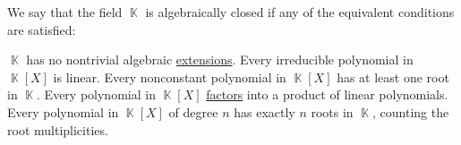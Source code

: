 \begin{definition}\label{def:algebraically_closed_field}
  We say that the field \( \BbbK \) is algebraically closed if any of the equivalent conditions are satisfied:
  \begin{thmenum}
     \( \BbbK \) has no nontrivial algebraic \hyperref[def:transcendental_element]{extensions}.
     Every irreducible polynomial in \( \BbbK[X] \) is linear.
     Every nonconstant polynomial in \( \BbbK[X] \) has at least one root in \( \BbbK \).
     Every polynomial in \( \BbbK[X] \) \hyperref[def:factorization_in_ring]{factors} into a product of linear polynomials.
     Every polynomial in \( \BbbK[X] \) of degree \( n \) has exactly \( n \) roots in \( \BbbK \), counting the root multiplicities.
  \end{thmenum}
\end{definition}
